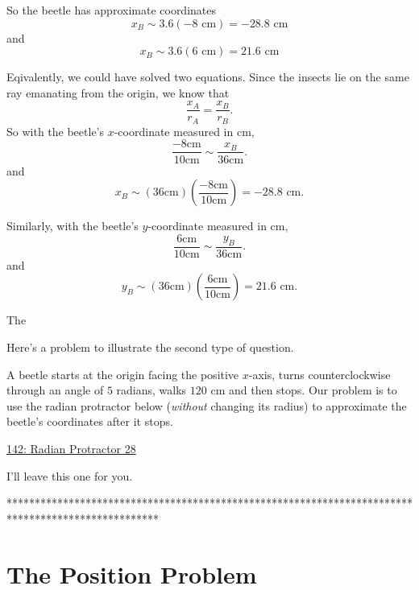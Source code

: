 \documentclass{ximera}
\begin{document}
\begin{question}
\begin{expandable}
So the beetle has approximate coordinates
\[
   x_B \sim 3.6(-8\text{ cm}) = -28.8 \text{ cm}
\]
and
\[
  x_B \sim 3.6(6\text{ cm}) = 21.6 \text{ cm}
\]

Eqivalently, we could have solved two equations. Since the insects lie on the same ray emanating from the origin, we know that
\[
  \frac{x_A}{r_A} = \frac{x_B}{r_B}.
\]
So with the beetle's $x$-coordinate measured in cm,
\[
      \frac{-8\text{cm}}{10\text{cm}} \sim \frac{x_B}{36\text{cm}}.
\]
and
\[
 x_B \sim (36\text{cm}) \left( \frac{-8\text{cm}}{10\text{cm}} \right) = -28.8\text{ cm} .
\]

Similarly, with the beetle's $y$-coordinate measured in cm,
\[
      \frac{6\text{cm}}{10\text{cm}} \sim \frac{y_B}{36\text{cm}}.
\]
and
\[
 y_B \sim (36\text{cm}) \left( \frac{6\text{cm}}{10\text{cm}} \right) = 21.6\text{ cm} .
\]


The

\end{expandable}




\end{question}


Here's a problem to illustrate the second type of question.

\begin{question} \label{QBeerteee}
A beetle starts at the origin facing the positive $x$-axis, turns counterclockwise through an angle of $5$ radians, walks $120$ cm and then stops. Our problem is to use the radian protractor below (\emph{without} changing its radius) to approximate the beetle's coordinates after it stops.

\begin{onlineOnly}
    \begin{center}
\end{center}

\href{https://www.desmos.com/calculator/jqc8dd0iws}{142: Radian Protractor 28}

\end{onlineOnly}

I'll leave this one for you.

\end{question}

\iffalse

***************************************************************************************************

\section{The Position Problem}
\end{document}
